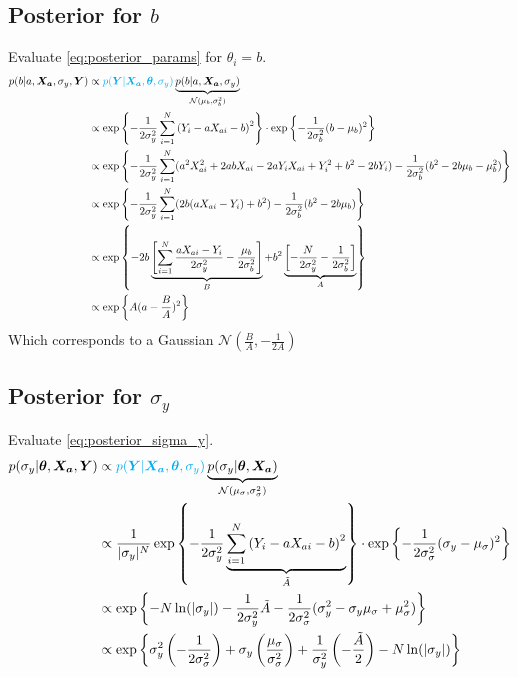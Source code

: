 \documentclass[10pt]{article}
\renewcommand{\vec}[1]{\boldsymbol{#1}}
\begin{document}
\subsection{Posterior for $b$}
Evaluate \cref{eq:posterior_params} for $\theta_i= b$.
\begin{align}
    p(b|a, \vec{X_a}, \sigma_y, \vec{Y}) &\propto {\color{cyan} p(\vec{Y} | \vec{X_a}, \vec{\theta}, \sigma_y)} \underbrace{p(b | a, \vec{X_a}, \sigma_{y})}_{\mathcal{N}(\mu_b, \sigma_b^2)} \\
    &\propto \exp\left\{ - \frac{1}{2\sigma_y^2} \sum_{i=1}^N \left( Y_i - a X_{ai} - b \right)^2 \right\} \cdot \exp\left\{ - \frac{1}{2\sigma_b^2} ( b - \mu_b )^2 \right\} \\
    &\propto \exp\left\{ - \frac{1}{2\sigma_y^2} \sum_{i=1}^N (a^2 X_{ai}^2  + 2 a b X_{ai} - 2 a Y_i X_{ai} + Y_i^2 + b^2 -2 b Y_i )- \frac{1}{2\sigma_b^2} ( b^2 - 2 b \mu_b - \mu_b^2 ) \right\} \\
    &\propto \exp\left\{ - \frac{1}{2\sigma_y^2} \sum_{i=1}^N (2 b (a X_{ai} - Y_i) + b^2 ) - \frac{1}{2\sigma_b^2} ( b^2 - 2 b \mu_b ) \right\} \\
    &\propto \exp\left\{ - 2 b \underbrace{\left[ \sum_{i=1}^N \frac{a X_{ai} - Y_i}{2\sigma_y^2} - \frac{\mu_b}{2\sigma_b^2} \right]}_{B} + b^2 \underbrace{\left[ - \frac{N}{2\sigma_y^2}  - \frac{1}{2\sigma_b^2} \right]}_{A} \right\} \\
    &\propto \exp\left\{A (a - \frac{B}{A})^2\right\}
\end{align}
Which corresponds to a Gaussian $\mathcal{N}(\frac{B}{A}, -\frac{1}{2A})$

\subsection{Posterior for $\sigma_y$}
Evaluate \cref{eq:posterior_sigma_y}.
\begin{align}
    p(\sigma_y | \vec{\theta}, \vec{X_a}, \vec{Y}) &\propto {\color{cyan} p(\vec{Y} | \vec{X_a}, \vec{\theta}, \sigma_y)} \underbrace{p(\sigma_y | \vec{\theta}, \vec{X_a})}_{\mathcal{N}(\mu_{\sigma}, \sigma_{\sigma}^2)} \\
    &\propto \frac{1}{|\sigma_y|^N} \exp\left\{ - \frac{1}{2\sigma_y^2} \underbrace{\sum_{i=1}^N \left( Y_i - a X_{ai} - b \right)^2}_{\tilde{A}} \right\} \cdot \exp\left\{ - \frac{1}{2\sigma_{\sigma}^2} ( \sigma_y - \mu_{\sigma} )^2 \right\} \\
    &\propto \exp\left\{ - N \ln(|\sigma_y|) - \frac{1}{2\sigma_y^2} \tilde{A} - \frac{1}{2\sigma_{\sigma}^2} ( \sigma_y^2 - \sigma_y \mu_{\sigma} + \mu_{\sigma}^2 ) \right\} \\
    &\propto \exp\left\{ \sigma_y^2 \left( - \frac{1}{2\sigma_{\sigma}^2} \right) + \sigma_y \left( \frac{\mu_{\sigma}}{\sigma_{\sigma}^2}\right) + \frac{1}{\sigma_y^2} \left( - \frac{\tilde{A}}{2} \right) - N \ln(|\sigma_y|) \right\} 
\end{align}
\end{document}
